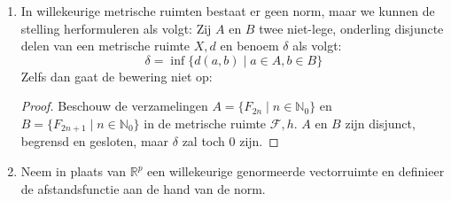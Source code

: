 \documentclass[main.tex]{subfiles}
\begin{document}
\begin{st}
\begin{enumerate}
\begin{itemize}
\begin{proof}
        \noindent
        \begin{minipage}{.45\textwidth}
          \begin{figure}[H]
            \centering
          \end{figure}
        \end{minipage}
        \begin{minipage}{.45\textwidth}
          \[ A = \left\{ (x,+y) \mid x \in \interval[open]{0}{1} \wedge y\in \interval[open]{0}{1} \right\} \]
          \[ A = \left\{ (x,-y) \mid x \in \interval[open]{0}{1} \wedge y\in \interval[open]{0}{1} \right\} \]
        \end{minipage}
        
        Het is duidelijk dat $A$ en $B$ beide niet gesloten zijn, maar wel begrensd.
        $\delta$ is toch $0$:
        \[ \delta = \inf \{ \|a-b\| \mid a \in A, b \in B \} = \inf \interval[open]{0}{\sqrt{5}} \]
      \end{proof}
    \end{itemize}
  \item In willekeurige metrische ruimten bestaat er geen norm, maar we kunnen de stelling herformuleren als volgt:
    Zij $A$ en $B$ twee niet-lege, onderling disjuncte delen van een metrische ruimte $X,d$ en benoem $\delta$ als volgt:
    \[ \delta = \inf \{ d(a,b) \mid a\in A, b\in B \} \]
    Zelfs dan gaat de bewering niet op:
    \begin{proof}
      Beschouw de verzamelingen $A = \{ F_{2n} \mid n \in \mathbb{N}_{0} \}$ en $B = \{ F_{2n+1} \mid n\in \mathbb{N}_{0} \}$ in de metrische ruimte $\mathcal{F},h$.
      $A$ en $B$ zijn disjunct, begrensd en gesloten, maar $\delta$ zal toch $0$ zijn.
    \end{proof}
  \item Neem in plaats van $\mathbb{R}^{p}$ een willekeurige genormeerde vectorruimte en definieer de afstandsfunctie aan de hand van de norm.
  \end{enumerate}
  \feed
\end{st}
\end{document}
